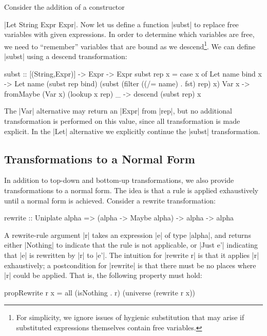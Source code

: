 \begin{example}
Consider the addition of a constructor \ignore|Let String Expr Expr|. Now let us define a function |subst| to replace free variables with given expressions. In order to determine which variables are free, we need to ``remember'' variables that are bound as we descend\footnote{For simplicity, we ignore issues of hygienic substitution that may arise if substituted expressions themselves contain free variables.}. We can define |subst| using a descend transformation:

\begin{code}
subst :: [(String,Expr)] -> Expr -> Expr
subst rep x =
    case  x of
          Let name bind x -> Let name (subst rep bind)
              (subst (filter ((/= name) . fst) rep) x)
          Var x -> fromMaybe (Var x) (lookup x rep)
          _ -> descend (subst rep) x
\end{code}

The |Var| alternative may return an |Expr| from |rep|, but no additional transformation is performed on this value, since all transformation is made explicit. In the |Let| alternative we explicitly continue the |subst| transformation.
\end{example}

\subsection{Transformations to a Normal Form}

In addition to top-down and bottom-up transformations, we also provide transformations to a normal form. The idea is that a rule is applied exhaustively until a normal form is achieved. Consider a rewrite transformation:

\begin{code}
rewrite :: Uniplate alpha => (alpha -> Maybe alpha) -> alpha -> alpha
\end{code}

A rewrite-rule argument |r| takes an expression |e| of type |alpha|, and returns either |Nothing| to indicate that the rule is not applicable, or |Just e'| indicating that |e| is rewritten by |r| to |e'|. The intuition for |rewrite r| is that it applies |r| exhaustively; a postcondition for |rewrite| is that there must be no places where |r| could be applied. That is, the following property must hold:

\begin{code}
propRewrite r x = all (isNothing . r) (universe (rewrite r x))
\end{code}

